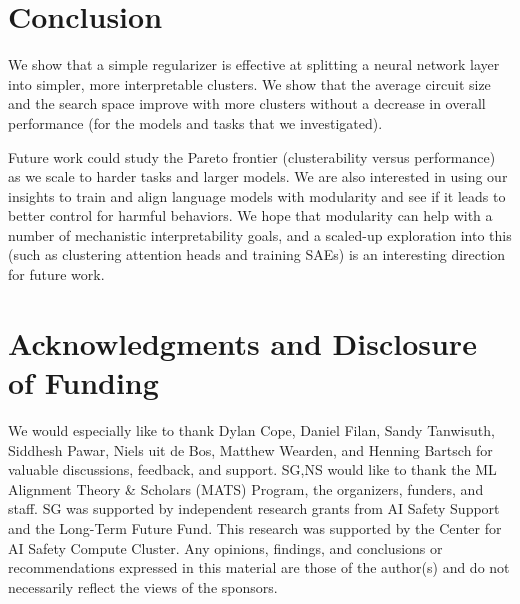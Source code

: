 \section{Conclusion}

We show that a simple regularizer is effective at splitting a neural network layer into simpler, more interpretable clusters. We show that the average circuit size and the search space improve with more clusters without a decrease in overall performance (for the models and tasks that we investigated).

Future work could study the Pareto frontier (clusterability versus performance) as we scale to harder tasks and larger models. We are also interested in using our insights to train and align language models with modularity and see if it leads to better control for harmful behaviors. We hope that modularity can help with a number of mechanistic interpretability goals, and a scaled-up exploration into this (such as clustering attention heads and training SAEs) is an interesting direction for future work.

\clearpage

\section{Acknowledgments and Disclosure of Funding}

We would especially like to thank Dylan Cope, Daniel Filan, Sandy Tanwisuth, Siddhesh Pawar, Niels uit de Bos, Matthew Wearden, and Henning Bartsch for valuable discussions, feedback, and support. SG,NS would like to thank the ML Alignment Theory \& Scholars (MATS) Program, the organizers, funders, and staff. SG was supported by independent research grants from AI Safety Support and the Long-Term Future Fund. This research was supported by the Center for AI Safety Compute Cluster.
Any opinions, findings, and conclusions or recommendations expressed in this material are those of the author(s) and do not necessarily reflect the views of the sponsors.